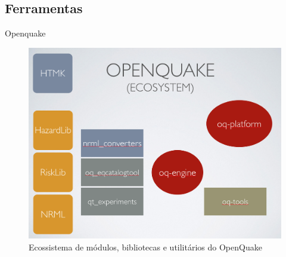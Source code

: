 \documentclass[ucs,8pt]{beamer}
\begin{document}
\subsection{Ferramentas}
\begin{frame}{Openquake}
\begin{figure}[!h]
  \centering
  \includegraphics[height=.90\textheight]{oq_ecosystem} 
  \caption{Ecossistema de módulos, bibliotecas e utilitários do OpenQuake}
  \label{fig:oq} 
\end{figure}
\end{frame}



\end{document}
